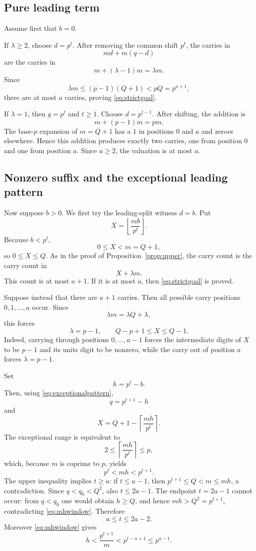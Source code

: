 \documentclass[11pt]{article}
\theoremstyle{definition}
\theoremstyle{remark}
\begin{document}
\subsection{Pure leading term}

Assume first that $b=0$.

If $\lambda\ge2$, choose $d=p^t$. After removing the common shift $p^t$, the carries in
\[
  md+m(q-d)
\]
are the carries in
\[
  m+(\lambda-1)m=\lambda m.
\]
Since
\[
  \lambda m\le(p-1)(Q+1)<pQ=p^{a+1},
\]
there are at most $a$ carries, proving \eqref{eq:strictgoal}.

If $\lambda=1$, then $q=p^t$ and $t\ge1$. Choose $d=p^{t-1}$. After shifting, the addition is
\[
  m+(p-1)m=pm.
\]
The base-$p$ expansion of $m=Q+1$ has a $1$ in positions $0$ and $a$ and zeroes elsewhere. Hence this addition produces exactly two carries, one from position $0$ and one from position $a$. Since $a\ge2$, the valuation is at most $a$.

\subsection{Nonzero suffix and the exceptional leading pattern}

Now suppose $b>0$. We first try the leading-split witness $d=b$. Put
\[
  X=\left\lfloor\frac{mb}{p^t}\right\rfloor.
\]
Because $b<p^t$,
\[
  0\le X<m=Q+1,
\]
so $0\le X\le Q$. As in the proof of Proposition~\ref{prop:upper}, the carry count is the carry count in
\[
  X+\lambda m.
\]
This count is at most $a+1$. If it is at most $a$, then \eqref{eq:strictgoal} is proved.

Suppose instead that there are $a+1$ carries. Then all possible carry positions $0,1,\dots,a$ occur. Since
\[
  \lambda m=\lambda Q+\lambda,
\]
this forces
\begin{equation}\label{eq:exceptionalpattern}
  \lambda=p-1,
  \qquad Q-p+1\le X\le Q-1.
\end{equation}
Indeed, carrying through positions $0,\dots,a-1$ forces the intermediate digits of $X$ to be $p-1$ and its units digit to be nonzero, while the carry out of position $a$ forces $\lambda=p-1$.

Set
\[
  h=p^t-b.
\]
Then, using \eqref{eq:exceptionalpattern},
\[
  q=p^{t+1}-h
\]
and
\[
  X=Q+1-\left\lceil\frac{mh}{p^t}\right\rceil.
\]
The exceptional range is equivalent to
\[
  2\le\left\lceil\frac{mh}{p^t}\right\rceil\le p,
\]
which, because $m$ is coprime to $p$, yields
\begin{equation}\label{eq:mhwindow}
  p^t<mh<p^{t+1}.
\end{equation}
The upper inequality implies $t\ge a$: if $t\le a-1$, then $p^{t+1}\le Q<m\le mh$, a contradiction. Since $q<q_0<Q^2$, also $t\le2a-1$. The endpoint $t=2a-1$ cannot occur: from $q<q_0$ one would obtain $h\ge Q$, and hence $mh>Q^2=p^{t+1}$, contradicting \eqref{eq:mhwindow}. Therefore
\begin{equation}\label{eq:trange}
  a\le t\le2a-2.
\end{equation}
Moreover \eqref{eq:mhwindow} gives
\[
  h<\frac{p^{t+1}}m<p^{t-a+1}\le p^{a-1}.
\]
\end{document}
